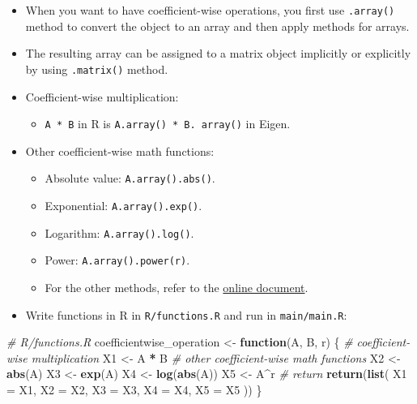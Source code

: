 \documentclass[
]{book}
\newenvironment{Shaded}{\begin{snugshade}}{\end{snugshade}}
\newcommand{\AttributeTok}[1]{\textcolor[rgb]{0.13,0.29,0.53}{#1}}
\newcommand{\CommentTok}[1]{\textcolor[rgb]{0.56,0.35,0.01}{\textit{#1}}}
\newcommand{\ControlFlowTok}[1]{\textcolor[rgb]{0.13,0.29,0.53}{\textbf{#1}}}
\newcommand{\FunctionTok}[1]{\textcolor[rgb]{0.13,0.29,0.53}{\textbf{#1}}}
\newcommand{\NormalTok}[1]{#1}
\newcommand{\OtherTok}[1]{\textcolor[rgb]{0.56,0.35,0.01}{#1}}
\newcommand{\SpecialCharTok}[1]{\textcolor[rgb]{0.81,0.36,0.00}{\textbf{#1}}}
\providecommand{\tightlist}{%
  \setlength{\itemsep}{0pt}\setlength{\parskip}{0pt}}
\begin{document}
\begin{itemize}
\item
  When you want to have coefficient-wise operations, you first use \texttt{.array()} method to convert the object to an array and then apply methods for arrays.
\item
  The resulting array can be assigned to a matrix object implicitly or explicitly by using \texttt{.matrix()} method.
\item
  Coefficient-wise multiplication:

  \begin{itemize}
  \tightlist
  \item
    \texttt{A\ *\ B} in R is \texttt{A.array()\ *\ B.\ array()} in Eigen.
  \end{itemize}
\item
  Other coefficient-wise math functions:

  \begin{itemize}
  \tightlist
  \item
    Absolute value: \texttt{A.array().abs()}.
  \item
    Exponential: \texttt{A.array().exp()}.
  \item
    Logarithm: \texttt{A.array().log()}.
  \item
    Power: \texttt{A.array().power(r)}.
  \item
    For the other methods, refer to the \href{https://eigen.tuxfamily.org/dox/group__CoeffwiseMathFunctions.html}{online document}.
  \end{itemize}
\item
  Write functions in R in \texttt{R/functions.R} and run in \texttt{main/main.R}:
\end{itemize}

\begin{Shaded}
\begin{Highlighting}[]
\CommentTok{\# R/functions.R}
\NormalTok{coefficientwise\_operation }\OtherTok{\textless{}{-}}
  \ControlFlowTok{function}\NormalTok{(A, B, r) \{}
    \CommentTok{\# coefficient{-}wise multiplication}
\NormalTok{    X1 }\OtherTok{\textless{}{-}}\NormalTok{ A }\SpecialCharTok{*}\NormalTok{ B}
    \CommentTok{\# other coefficient{-}wise math functions}
\NormalTok{    X2 }\OtherTok{\textless{}{-}} \FunctionTok{abs}\NormalTok{(A)}
\NormalTok{    X3 }\OtherTok{\textless{}{-}} \FunctionTok{exp}\NormalTok{(A)}
\NormalTok{    X4 }\OtherTok{\textless{}{-}} \FunctionTok{log}\NormalTok{(}\FunctionTok{abs}\NormalTok{(A))}
\NormalTok{    X5 }\OtherTok{\textless{}{-}}\NormalTok{ A}\SpecialCharTok{\^{}}\NormalTok{r}
    \CommentTok{\# return}
    \FunctionTok{return}\NormalTok{(}\FunctionTok{list}\NormalTok{(}
      \AttributeTok{X1 =}\NormalTok{ X1,}
      \AttributeTok{X2 =}\NormalTok{ X2,}
      \AttributeTok{X3 =}\NormalTok{ X3,}
      \AttributeTok{X4 =}\NormalTok{ X4,}
      \AttributeTok{X5 =}\NormalTok{ X5}
\NormalTok{    ))}
\NormalTok{  \}}
\end{Highlighting}
\end{Shaded}
\end{document}
